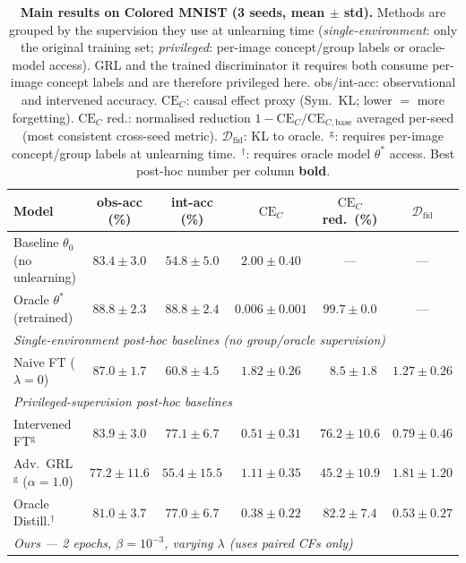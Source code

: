 \documentclass{article}
\newcommand{\CE}{\mathrm{CE}}
\newcommand{\Dfid}{\mathcal{D}_{\mathrm{fid}}}
\begin{document}
\begin{table}[t]
\centering
\caption{%
  \textbf{Main results on Colored MNIST (3 seeds, mean $\pm$ std).}
  Methods are grouped by the supervision they use at unlearning time
  (\emph{single-environment}: only the original training set;
  \emph{privileged}: per-image concept/group labels or
  oracle-model access).  GRL and the trained discriminator it requires both
  consume per-image concept labels and are therefore privileged here.
  obs/int-acc: observational and intervened accuracy.
  $\CE_C$: causal effect proxy (Sym.\ KL; lower $=$ more forgetting).
  $\CE_C$ red.: normalised reduction $1-\CE_C/\CE_{C,\mathrm{base}}$
  averaged per-seed (most consistent cross-seed metric).
  $\Dfid$: KL to oracle.
  $^{\,\mathrm{g}}$: requires per-image concept/group labels at unlearning time.
  $^{\,\dagger}$: requires oracle model $\theta^*$ access.
  Best post-hoc number per column \textbf{bold}.
}
\label{tab:main}
\smallskip
\small
\setlength{\tabcolsep}{4.5pt}
\begin{tabular}{lccccc}
\toprule
\textbf{Model} & obs-acc (\%) & int-acc (\%) & $\CE_C$ & $\CE_C$ red.\ (\%) & $\Dfid$ \\
\midrule
Baseline $\theta_0$ (no unlearning)  & $83.4 \pm 3.0$ & $54.8 \pm 5.0$ & $2.00 \pm 0.40$ & ---             & --- \\
Oracle $\theta^*$ (retrained)        & $88.8 \pm 2.3$ & $88.8 \pm 2.4$ & $0.006 \pm 0.001$ & $99.7\pm0.0$ & --- \\
\midrule
\multicolumn{6}{l}{\textit{Single-environment post-hoc baselines (no group/oracle supervision)}} \\
Naive FT ($\lambda{=}0$)             & $87.0 \pm 1.7$ & $60.8 \pm 4.5$ & $1.82 \pm 0.26$ & $\;\;8.5 \pm 1.8$ & $1.27 \pm 0.26$ \\
\midrule
\multicolumn{6}{l}{\textit{Privileged-supervision post-hoc baselines}} \\
Intervened FT$^{\mathrm{g}}$         & $83.9 \pm 3.0$ & $77.1 \pm 6.7$ & $0.51 \pm 0.31$ & $76.2 \pm 10.6$ & $0.79 \pm 0.46$ \\
Adv.\ GRL$^{\mathrm{g}}$ ($\alpha{=}1.0$) & $77.2 \pm 11.6$ & $55.4 \pm 15.5$ & $1.11 \pm 0.35$ & $45.2 \pm 10.9$ & $1.81 \pm 1.20$ \\
Oracle Distill.$^{\dagger}$          & $81.0 \pm 3.7$ & $77.0 \pm 6.7$ & $0.38 \pm 0.22$ & $82.2 \pm 7.4$ & $0.53 \pm 0.27$ \\
\midrule
\multicolumn{6}{l}{\textit{Ours --- 2 epochs, $\beta{=}10^{-3}$, varying $\lambda$ (uses paired CFs only)}} \\

\end{tabular}
\end{table}
\end{document}

